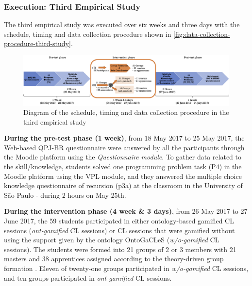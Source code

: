 \subsubsection{Execution: Third Empirical Study}

The third empirical study was executed over six weeks and three days with the schedule, timing and data collection procedure shown in \autoref{fig:data-collection-procedure-third-study}.

\begin{figure}[htb]
 \caption{Diagram of the schedule, timing and data collection procedure in the third empirical study}
 \label{fig:data-collection-procedure-third-study}
 \centering
 \includegraphics[width=1\textwidth]{images/chap-evaluation/data-collection-procedure-third-study.png}
 \fautor
\end{figure}

\textbf{During the pre-test phase (1 week)}, from 18 May 2017 to 25 May 2017, the Web-based QPJ-BR questionnaire were answered by all the participants through the Moodle platform using the \emph{Questionnaire module}. To gather data related to the skill/knowledge, students solved one programming problem task (P4) in the Moodle platform using the VPL module, and they answered the multiple choice knowledge questionnaire of recursion (p3a) at the classroom in the University of São Paulo - during 2 hours on May 25th.

\textbf{During the intervention phase (4 week \& 3 days)}, from 26 May 2017 to 27 June 2017, the 59 students participated in either ontology-based gamified CL sessions (\emph{ont-gamified} CL sessions) or CL sessions that were gamified without using the support given by the ontology OntoGaCLeS (\emph{w/o-gamified} CL sessions). The students were formed into 21 groups of 2 or 3 members with 21 masters and 38 apprentices assigned according to the theory-driven group formation \cite{IsotaniMizoguchi2008a}. Eleven of twenty-one groups participated in \emph{w/o-gamified} CL sessions, and ten groups participated in \emph{ont-gamified} CL sessions.

